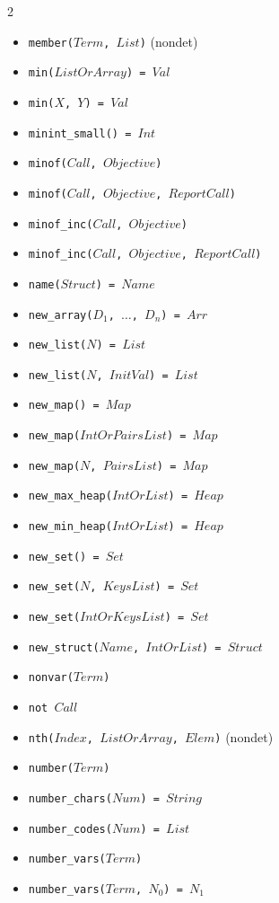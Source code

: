 \documentclass[10pt]{article}
\begin{document}
\begin{multicols}{2}
\begin{scriptsize}
\begin{itemize}
    \item \texttt{member($Term$, $List$)} (nondet)
    \item \texttt{min($ListOrArray$) = $Val$} 
    \item \texttt{min($X$, $Y$) = $Val$} 
    \item \texttt{minint\_small() = $Int$}
    \item \texttt{minof($Call$, $Objective$)} 
    \item \texttt{minof($Call$, $Objective$, $ReportCall$)} 
    \item \texttt{minof\_inc($Call$, $Objective$)} 
    \item \texttt{minof\_inc($Call$, $Objective$, $ReportCall$)} 
    \item \texttt{name($Struct$) = $Name$} 
    \item \texttt{new\_array($D_1$, $\ldots$, $D_n$) = $Arr$} 
    \item \texttt{new\_list($N$) = $List$} 
    \item \texttt{new\_list($N$, $InitVal$) = $List$} 
    \item \texttt{new\_map() = $Map$} 
    \item \texttt{new\_map($IntOrPairsList$) = $Map$} 
    \item \texttt{new\_map($N$, $PairsList$) = $Map$} 
    \item \texttt{new\_max\_heap($IntOrList$) = $Heap$}
    \item \texttt{new\_min\_heap($IntOrList$) = $Heap$}
    \item \texttt{new\_set() = $Set$} 
    \item \texttt{new\_set($N$, $KeysList$) = $Set$} 
    \item \texttt{new\_set($IntOrKeysList$) = $Set$} 
    \item \texttt{new\_struct($Name$, $IntOrList$) = $Struct$} 
    \item \texttt{nonvar($Term$)} 
    \item \texttt{not $Call$}
    \item \texttt{nth($Index$, $ListOrArray$, $Elem$)} (nondet)
    \item \texttt{number($Term$)} 
    \item \texttt{number\_chars($Num$) = $String$} 
    \item \texttt{number\_codes($Num$) = $List$} 
    \item \texttt{number\_vars($Term$)}
    \item \texttt{number\_vars($Term$, $N_0$) = $N_1$}

\end{itemize}
\end{scriptsize}
\end{multicols}
\end{document}
